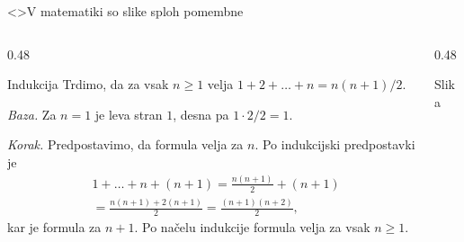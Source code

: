 \begin{frame}<\vsotakoraki>{V matematiki so slike sploh pomembne}
  \begin{columns}[T]
    \begin{column}{0.48\textwidth}
      \begin{block}{Indukcija}
        \scriptsize
        \setlength{\abovedisplayskip}{3pt}
        \setlength{\belowdisplayskip}{3pt}
        Trdimo, da za vsak \(n \geq 1\) velja
        \(1 + 2 + \dots + n = n(n + 1)/2\).

        \emph{Baza.} Za \(n = 1\) je leva stran \(1\), desna pa
        \(1 \cdot 2/2 = 1\).

        \emph{Korak.} Predpostavimo, da formula velja za \(n\). Po indukcijski
        predpostavki je
        \begin{align*}
          &1 + \dots + n + (n + 1)
          = \frac{n(n + 1)}{2} + (n + 1) \\
          &= \frac{n(n + 1) + 2(n + 1)}{2}
          = \frac{(n + 1)(n + 2)}{2},
        \end{align*}
        kar je formula za \(n + 1\). Po načelu indukcije formula velja za vsak
        \(n \geq 1\).
      \end{block}
    \end{column}
    \begin{column}{0.48\textwidth}
      \begin{block}{Slika}
        \centering

      \end{block}
    \end{column}
  \end{columns}
\end{frame}
